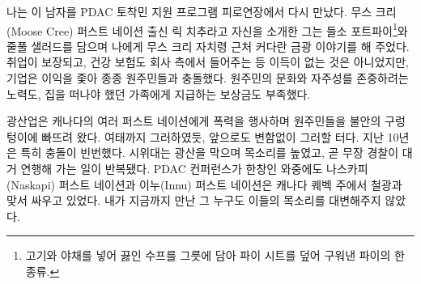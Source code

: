 \documentclass{translation}
\begin{document}
나는 이 남자를 PDAC 토착민 지원 프로그램 피로연장에서 다시 만났다.
무스 크리(Moose Cree) 퍼스트 네이션 출신 릭 치추라고 자신을 소개한 그는 들소 포트파이\footnote{고기와 야채를 넣어 끓인 수프를 그릇에 담아 파이 시트를 덮어 구워낸 파이의 한 종류.}와 줄풀 샐러드를 담으며 나에게 무스 크리 자치령 근처 커다란 금광 이야기를 해 주었다.
취업이 보장되고, 건강 보험도 회사 측에서 들어주는 등 이득이 없는 것은 아니었지만, 기업은 이익을 좇아 종종 원주민들과 충돌했다.
원주민의 문화와 자주성를 존중하려는 노력도, 집을 떠나야 했던 가족에게 지급하는 보상금도 부족했다.
%

광산업은 캐나다의 여러 퍼스트 네이션에게 폭력을 행사하며 원주민들을 불안의 구렁텅이에 빠뜨려 왔다.
여태까지 그러하였듯, 앞으로도 변함없이 그러할 터다.
지난 10년은 특히 충돌이 빈번했다.
시위대는 광산을 막으며 목소리를 높였고, 곧 무장 경찰이 대거 연행해 가는 일이 반복됐다.
PDAC 컨퍼런스가 한창인 와중에도 나스카피(Naskapi) 퍼스트 네이션과 이누(Innu) 퍼스트 네이션은 캐나다 퀘벡 주에서 철광과 맞서 싸우고 있었다.
내가 지금까지 만난 그 누구도 이들의 목소리를 대변해주지 않았다.
\end{document}
